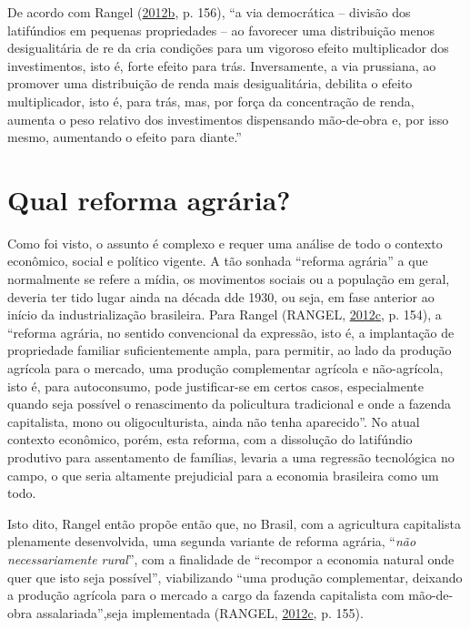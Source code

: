 \documentclass[a4paper, 12pt]{article}
\begin{document}
De acordo com Rangel
(\protect\hyperlink{ref-rangel1988}{2012}\protect\hyperlink{ref-rangel1988}{b},
p. 156), ``a via democrática -- divisão dos latifúndios em pequenas
propriedades -- ao favorecer uma distribuição menos desigualitária de re
da cria condições para um vigoroso efeito multiplicador dos
investimentos, isto é, forte efeito para trás. Inversamente, a via
prussiana, ao promover uma distribuição de renda mais desigualitária,
debilita o efeito multiplicador, isto é, para trás, mas, por força da
concentração de renda, aumenta o peso relativo dos investimentos
dispensando mão-de-obra e, por isso mesmo, aumentando o efeito para
diante.''

\hypertarget{qual-reforma-agraria}{%
\section{Qual reforma agrária?}\label{qual-reforma-agraria}}

Como foi visto, o assunto é complexo e requer uma análise de todo o
contexto econômico, social e político vigente. A tão sonhada ``reforma
agrária'' a que normalmente se refere a mídia, os movimentos sociais ou
a população em geral, deveria ter tido lugar ainda na década dde 1930,
ou seja, em fase anterior ao início da industrialização brasileira. Para
Rangel (RANGEL,
\protect\hyperlink{ref-rangel1986a}{2012}\protect\hyperlink{ref-rangel1986a}{c},
p. 154), a ``reforma agrária, no sentido convencional da expressão, isto
é, a implantação de propriedade familiar suficientemente ampla, para
permitir, ao lado da produção agrícola para o mercado, uma produção
complementar agrícola e não-agrícola, isto é, para autoconsumo, pode
justificar-se em certos casos, especialmente quando seja possível o
renascimento da policultura tradicional e onde a fazenda capitalista,
mono ou oligoculturista, ainda não tenha aparecido''. No atual contexto
econômico, porém, esta reforma, com a dissolução do latifúndio produtivo
para assentamento de famílias, levaria a uma regressão tecnológica no
campo, o que seria altamente prejudicial para a economia brasileira como
um todo.

Isto dito, Rangel então propõe então que, no Brasil, com a agricultura
capitalista plenamente desenvolvida, uma segunda variante de reforma
agrária, ``\emph{não necessariamente rural}'', com a finalidade de
``recompor a economia natural onde quer que isto seja possível'',
viabilizando ``uma produção complementar, deixando a produção agrícola
para o mercado a cargo da fazenda capitalista com mão-de-obra
assalariada'',seja implementada (RANGEL,
\protect\hyperlink{ref-rangel1986a}{2012}\protect\hyperlink{ref-rangel1986a}{c},
p. 155).
\end{document}
